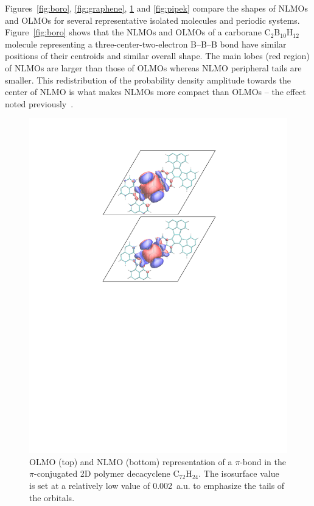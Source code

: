 \documentclass[aps,prl,reprint,amsmath,amssymb]{revtex4-1}
\begin{document}
Figures~\ref{fig:boro}, \ref{fig:graphene}, \ref{fig:decacyclene} and \ref{fig:pipek} compare the shapes of NLMOs and OLMOs for several representative isolated molecules and periodic systems. 
Figure~\ref{fig:boro} shows that the NLMOs and OLMOs of a carborane C$_2$B$_{10}$H$_{12}$ molecule representing a three-center-two-electron B--B--B bond have similar positions of their centroids and similar overall shape. 
The main lobes (red region) of NLMOs are larger than those of OLMOs whereas NLMO peripheral tails are smaller. This redistribution of the probability density amplitude towards the center of NLMO is what makes NLMOs more compact than OLMOs -- the effect noted previously~\cite{liu2000nonorthogonal}. 

\begin{figure}[htbp]
\includegraphics[scale=0.8]{C72H24.pdf} 
  \caption{OLMO (top) and NLMO (bottom) representation of a $\pi$-bond in the $\pi$-conjugated 2D polymer decacyclene C$_{72}$H$_{24}$. The isosurface value is set at a relatively low value of 0.002~a.u. to emphasize the tails of the orbitals.}
\label{fig:decacyclene}
\end{figure}
\end{document}
